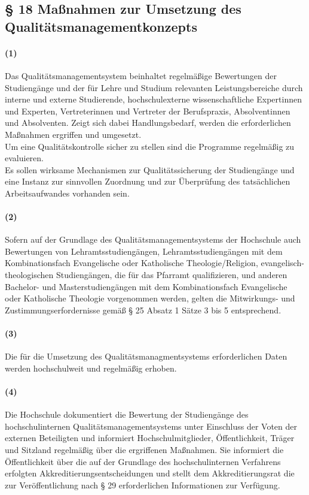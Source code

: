 \documentclass[a4paper]{scrartcl}
\begin{document}
\subsection{§ 18 Maßnahmen zur Umsetzung des Qualitätsmanagementkonzepts}
\paragraph{(1)} Das Qualitätsmanagementsystem beinhaltet regelmäßige Bewertungen der Studiengänge und der für Lehre und Studium relevanten Leistungsbereiche durch interne und externe Studierende, hochschulexterne wissenschaftliche Expertinnen und Experten, Vertreterinnen und Vertreter der Berufspraxis, Absolventinnen und Absolventen.
Zeigt sich dabei Handlungsbedarf, werden die erforderlichen Maßnahmen ergriffen und umgesetzt.\\

\textcolor{Bernd}{\textbf{\cite{RESO: SoSe2013-SysAkk}}Um eine Qualitätskontrolle sicher zu stellen sind die Programme regelmäßig zu evaluieren.}\\

\textcolor{Bernd}{\textbf{\cite{RESO: SoSe2010-BaMa}} Es sollen wirksame Mechanismen zur Qualitätssicherung der Studiengänge und eine Instanz zur sinnvollen Zuordnung und zur Überprüfung des tatsächlichen Arbeitsaufwandes vorhanden sein.}

\paragraph{(2)} Sofern auf der Grundlage des Qualitätsmanagementsystems der Hochschule auch Bewertungen von Lehramtsstudiengängen, Lehramtsstudiengängen mit dem Kombinationsfach Evangelische oder Katholische Theologie/Religion, evangelisch-theologischen Studiengängen, die für das Pfarramt qualifizieren, und anderen Bachelor- und Masterstudiengängen mit dem Kombinationsfach Evangelische oder Katholische Theologie vorgenommen werden, gelten die Mitwirkungs- und Zustimmungserfordernisse gemäß § 25 Absatz 1 Sätze 3 bis 5 entsprechend.
\paragraph{(3)} Die für die Umsetzung des Qualitätsmanagmentsystems erforderlichen Daten werden hochschulweit und regelmäßig erhoben.
\paragraph{(4)} Die Hochschule dokumentiert die Bewertung der Studiengänge des hochschulinternen Qualitätsmanagementsystems unter Einschluss der Voten der externen Beteiligten und informiert Hochschulmitglieder, Öffentlichkeit, Träger und Sitzland regelmäßig über die ergriffenen Maßnahmen. Sie informiert die Öffentlichkeit über die auf der Grundlage des hochschulinternen Verfahrens erfolgten  Akkreditierungsentscheidungen und stellt dem Akkreditierungsrat die zur Veröffentlichung nach § 29 erforderlichen Informationen zur Verfügung.
\end{document}
